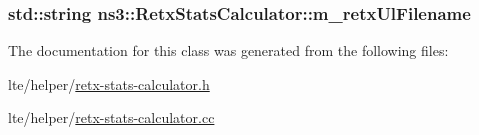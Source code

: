 \subsubsection[{\texorpdfstring{m\+\_\+retx\+Ul\+Filename}{m_retxUlFilename}}]{\setlength{\rightskip}{0pt plus 5cm}std\+::string ns3\+::\+Retx\+Stats\+Calculator\+::m\+\_\+retx\+Ul\+Filename}\hypertarget{classns3_1_1RetxStatsCalculator_a52fa63b352f82f4cc51e1906a73b5033}{}\label{classns3_1_1RetxStatsCalculator_a52fa63b352f82f4cc51e1906a73b5033}


The documentation for this class was generated from the following files\+:\begin{DoxyCompactItemize}
\item 
lte/helper/\hyperlink{retx-stats-calculator_8h}{retx-\/stats-\/calculator.\+h}\item 
lte/helper/\hyperlink{retx-stats-calculator_8cc}{retx-\/stats-\/calculator.\+cc}\end{DoxyCompactItemize}

